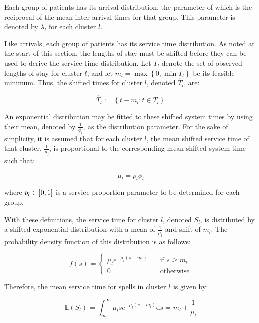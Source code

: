 \documentclass[]{interact}
\theoremstyle{plain}%
\theoremstyle{definition}
\theoremstyle{remark}
\begin{document}
Each group of patients has its arrival distribution, the parameter of which is
the reciprocal of the mean inter-arrival times for that group. This parameter
is denoted by \(\lambda_l\) for each cluster \(l\).

Like arrivals, each group of patients has its service time distribution. As
noted at the start of this section, the lengths of stay must be shifted before
they can be used to derive the service time distribution. Let \(T_l\) denote the
set of observed lengths of stay for cluster \(l\), and let
\(m_l = \max \left\{0, \min T_l\right\}\) be its feasible minimum. Thus, the
shifted times for cluster \(l\), denoted \(\widehat T_l\), are:

\begin{equation}\label{eq:shifted}
    \widehat T_l := \left\{t - m_l : t \in T_l\right\}
\end{equation}

An exponential distribution may be fitted to these shifted system times by
using their mean, denoted by \(\frac{1}{\phi_l}\), as the distribution
parameter. For the sake of simplicity, it is assumed that for each cluster
\(l\), the mean shifted service time of that cluster, \(\frac{1}{\mu_l}\), is
proportional to the corresponding mean shifted system time such that:

\begin{equation}\label{eq:shifted_services}
    \mu_l = p_l \phi_l
\end{equation}

\noindent where \(p_l \in \interval[open left]{0}{1}\) is a service proportion
parameter to be determined for each group.

With these definitions, the service time for cluster \(l\), denoted \(S_l\), is
distributed by a shifted exponential distribution with a mean of
\(\frac{1}{\mu_l}\) and shift of \(m_l\). The probability density function of
this distribution is as follows:

\begin{equation}\label{eq:shifted_pdf}
    f(s) = \begin{cases}
        \mu_l e^{-\mu_l (s - m_l)} & \quad \text{if \(s \ge m_l\)}\\
        0 & \quad \text{otherwise}
    \end{cases}
\end{equation}

Therefore, the mean service time for spells in cluster \(l\) is given by:

\begin{equation}\label{eq:services}
    \mathbb E \left(S_l\right)
    = \int_{m_l}^{\infty} \mu_l s e^{-\mu_l (s - m_l)} \mathrm ds
    = m_l + \frac{1}{\mu_l}
\end{equation}
\end{document}
